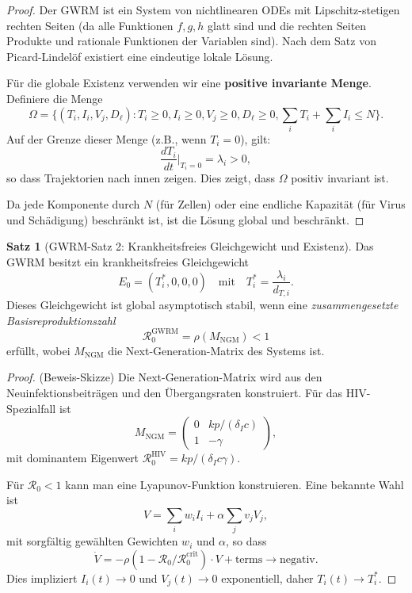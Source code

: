 ﻿\documentclass[a4paper,12pt]{article}
\theoremstyle{definition}
\newtheorem{satz}{Satz}
\begin{document}
\begin{proof}
Der GWRM ist ein System von nichtlinearen ODEs mit Lipschitz-stetigen rechten Seiten (da alle Funktionen $f, g, h$ glatt sind und die rechten Seiten Produkte und rationale Funktionen der Variablen sind). Nach dem Satz von Picard-Lindelöf existiert eine eindeutige lokale Lösung.

Für die globale Existenz verwenden wir eine \textbf{positive invariante Menge}. Definiere die Menge
\[
\Omega = \{(T_i, I_i, V_j, D_\ell) : T_i \geq 0, I_i \geq 0, V_j \geq 0, D_\ell \geq 0, \sum_i T_i + \sum_i I_i \leq N\}.
\]
Auf der Grenze dieser Menge (z.B., wenn $T_i = 0$), gilt:
\[
\frac{dT_i}{dt}\bigg|_{T_i=0} = \lambda_i > 0,
\]
so dass Trajektorien nach innen zeigen. Dies zeigt, dass $\Omega$ positiv invariant ist.

Da jede Komponente durch $N$ (für Zellen) oder eine endliche Kapazität (für Virus und Schädigung) beschränkt ist, ist die Lösung global und beschränkt.
\end{proof}

\begin{satz}[GWRM-Satz 2: Krankheitsfreies Gleichgewicht und Existenz]
Das GWRM besitzt ein krankheitsfreies Gleichgewicht
\[
E_0 = (T_i^*, 0, 0, 0) \quad \text{mit} \quad T_i^* = \frac{\lambda_i}{d_{T,i}}.
\]
Dieses Gleichgewicht ist global asymptotisch stabil, wenn eine \emph{zusammengesetzte Basisreproduktionszahl}
\[
\mathcal{R}_0^{\text{GWRM}} = \rho(M_{\text{NGM}}) < 1
\]
erfüllt, wobei $M_{\text{NGM}}$ die Next-Generation-Matrix des Systems ist.
\end{satz}

\begin{proof}
(Beweis-Skizze) Die Next-Generation-Matrix wird aus den Neuinfektionsbeiträgen und den Übergangsraten konstruiert. Für das HIV-Spezialfall ist
\[
M_{\text{NGM}} = \begin{pmatrix} 0 & k p / (\delta_I c) \\ 1 & - \gamma \end{pmatrix},
\]
mit dominantem Eigenwert $\mathcal{R}_0^{\text{HIV}} = kp/(\delta_I c \gamma)$.

Für $\mathcal{R}_0 < 1$ kann man eine Lyapunov-Funktion konstruieren. Eine bekannte Wahl ist
\[
V = \sum_{i} w_i I_i + \alpha \sum_j v_j V_j,
\]
mit sorgfältig gewählten Gewichten $w_i$ und $\alpha$, so dass
\[
\dot{V} = - \rho (1 - \mathcal{R}_0/\mathcal{R}_0^{\text{crit}}) \cdot V + \text{terms} \rightarrow \text{negativ}.
\]
Dies impliziert $I_i(t) \to 0$ und $V_j(t) \to 0$ exponentiell, daher $T_i(t) \to T_i^*$.
\end{proof}
\end{document}
